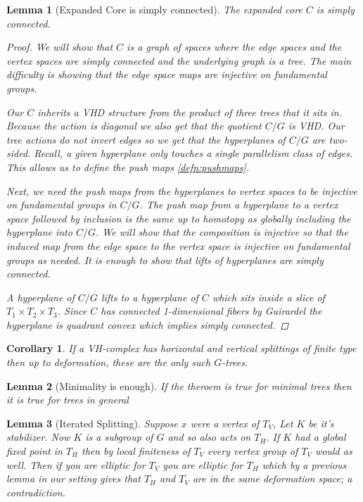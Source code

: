 \documentclass{article}
\theoremstyle{mystyle}
\newtheorem{lem}{Lemma}[section]
\newtheorem*{cor*}{Corollary}
\theoremstyle{remark}
\begin{document}
\begin{lem}
    [Expanded Core is simply connected]
    \label{lem:coresc} 
    The expanded core $C$ is simply connected.
    
    \begin{proof}
        We will show that $C$ is a graph of spaces where the edge spaces and the vertex spaces are simply connected and the underlying graph is a tree. The main difficulty is showing that the edge space maps are injective on fundamental groups.
    
        Our \(C\) inherits a VHD structure from the product of three trees that it sits in. Because the action is diagonal we also get that the quotient \(C/G\) is VHD. Our tree actions do not invert edges so we get that the hyperplanes of \(C/G\) are two-sided. Recall, a given hyperplane only touches a single parallelism class of edges. This allows us to define the push maps \ref{defn:pushmaps}.  

    Next, we need the push maps from the hyperplanes to vertex spaces to be injective on fundamental groups in $C/G$. The push map from a hyperplane to a vertex space followed by inclusion is the same up to homotopy as globally including the hyperplane into \(C/G\). We will show that the composition is injective so that the induced map from the edge space to the vertex space is injective on fundamental groups as needed. It is enough to show that lifts of hyperplanes are simply connected.
    
    A hyperplane of $C/G$ lifts to a hyperplane of $C$ which sits inside a slice of $T_1 \times T_2\times T_3$. Since $C$ has connected 1-dimensional fibers by Guirardel the hyperplane is quadrant convex which implies simply connected.
    
    \end{proof}
    
\end{lem}

\begin{cor*}
    If a VH-complex has horizontal and vertical splittings of finite type then up to deformation, these are the only such \(G\)-trees.
\end{cor*}

\begin{lem}
    [Minimality is enough]
    \label{lem:minenough} 
    If the theroem is true for minimal trees then it is true for trees in general
\end{lem}

\begin{lem}
    [Iterated Splitting]
    \label{lem:iteratedsplitting} 
    Suppose \(x\) were a vertex of \(T_{V}\), Let \(K\) be it's stabilizer. Now \(K\) is a subgroup of \(G\) and so also acts on \(T_H\). If \(K\) had a global fixed point in \(T_H\)  then by local finiteness of \(T_V\) every vertex group of \(T_V\) would as well. Then if you are elliptic for \(T_V\) you are elliptic for \(T_H\) which by a previous lemma in our setting gives that \(T_H\) and \(T_V\) are in the same deformation space; a contradiction.
\end{lem}
\end{document}
